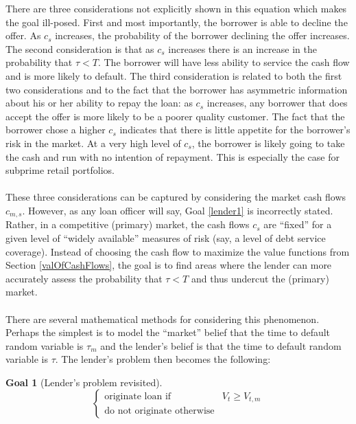 \documentclass{article}
\theoremstyle{definition}
\newtheorem{goal}{Goal}
\begin{document}
There are three considerations not explicitly shown in this equation which makes the goal ill-posed.  First and most importantly, the borrower is able to decline the offer.  As \(c_s\) increases, the probability of the borrower declining the offer increases.  The second consideration is that as \(c_s\) increases there is an increase in the probability that \(\tau<T\).  The borrower will have less ability to service the cash flow and is more likely to default.  The third consideration is related to both the first two considerations and to the fact that the borrower has asymmetric information about his or her ability to repay the loan: as \(c_s\) increases, any borrower that does accept the offer is more likely to be a poorer quality customer.  The fact that the borrower chose a higher \(c_s\) indicates that there is little appetite for the borrower's risk in the market.  At a very high level of \(c_s\), the borrower is likely going to take the cash and run with no intention of repayment.  This is especially the case for subprime retail portfolios.  
\\
\\
These three considerations can be captured by considering the market cash flows \(c_{m, s}\).  However, as any loan officer will say, Goal \ref{lender1} is incorrectly stated.  Rather, in a competitive (primary) market, the cash flows \(c_s\) are ``fixed'' for a given level of ``widely available'' measures of risk (say, a level of debt service coverage).  Instead of choosing the cash flow to maximize the value functions from Section \ref{valOfCashFlows}, the goal is to find areas where the lender can more accurately assess the probability that \(\tau<T\) and thus undercut the (primary) market.  
\\
\\
There are several mathematical methods for considering this phenomenon.  Perhaps the simplest is to model the ``market'' belief that the time to default random variable is \(\tau_m\) and the lender's belief is that the time to default random variable is \(\tau\).  The lender's problem then becomes the following:


\begin{goal}[Lender's problem revisited] \label{lender2}
	\[
	\left\{
	\begin{array}{ll}
	\text{originate loan if} & V_t\geq V_{t, m}\\
	\text{do not originate otherwise} 
	\end{array} \right.
	\]
	
\end{goal}
\end{document}
